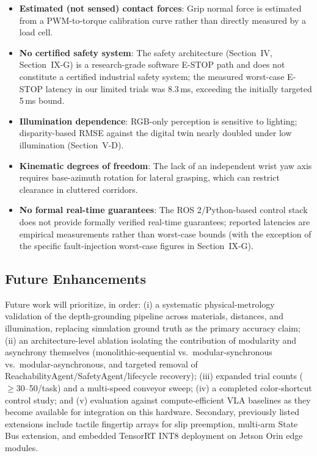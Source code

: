 \documentclass[journal]{IEEEtran}
\begin{document}
\begin{itemize}
    \item \textbf{Estimated (not sensed) contact forces}: Grip normal force is estimated from a PWM-to-torque calibration curve rather than directly measured by a load cell.
    \item \textbf{No certified safety system}: The safety architecture (Section~IV, Section~IX-G) is a research-grade software E-STOP path and does not constitute a certified industrial safety system; the measured worst-case E-STOP latency in our limited trials was $8.3$\,ms, exceeding the initially targeted 5\,ms bound.
    \item \textbf{Illumination dependence}: RGB-only perception is sensitive to lighting; disparity-based RMSE against the digital twin nearly doubled under low illumination (Section~V-D).
    \item \textbf{Kinematic degrees of freedom}: The lack of an independent wrist yaw axis requires base-azimuth rotation for lateral grasping, which can restrict clearance in cluttered corridors.
    \item \textbf{No formal real-time guarantees}: The ROS 2/Python-based control stack does not provide formally verified real-time guarantees; reported latencies are empirical measurements rather than worst-case bounds (with the exception of the specific fault-injection worst-case figures in Section~IX-G).
\end{itemize}

\subsection{Future Enhancements}
Future work will prioritize, in order: (i) a systematic physical-metrology validation of the depth-grounding pipeline across materials, distances, and illumination, replacing simulation ground truth as the primary accuracy claim; (ii) an architecture-level ablation isolating the contribution of modularity and asynchrony themselves (monolithic-sequential vs.\ modular-synchronous vs.\ modular-asynchronous, and targeted removal of ReachabilityAgent/SafetyAgent/lifecycle recovery); (iii) expanded trial counts ($\ge$30--50/task) and a multi-speed conveyor sweep; (iv) a completed color-shortcut control study; and (v) evaluation against compute-efficient VLA baselines as they become available for integration on this hardware. Secondary, previously listed extensions include tactile fingertip arrays for slip preemption, multi-arm State Bus extension, and embedded TensorRT INT8 deployment on Jetson Orin edge modules.
\end{document}
